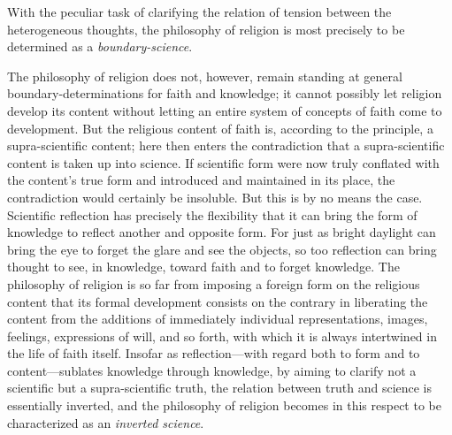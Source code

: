 \documentclass[12pt,a4paper]{article}
\begin{document}
With the peculiar task of clarifying the relation of tension
between the heterogeneous thoughts, the philosophy of religion
is most precisely to be determined as a \emph{boundary-science}.

The philosophy of religion does not, however, remain standing at
general boundary-determinations for faith and knowledge; it
cannot possibly let religion develop its content without letting
an entire system of concepts of faith come to development. But
the religious content of faith is, according to the principle,
a supra-scientific content; here then enters the contradiction
that a supra-scientific content is taken up into science. If
scientific form were now truly conflated with the content's true
form and introduced and maintained in its place, the
contradiction would certainly be insoluble. But this is by no
means the case. Scientific reflection has precisely the
flexibility that it can bring the form of knowledge to reflect
another and opposite form. For just as bright daylight can bring
the eye to forget the glare and see the objects, so too
reflection can bring thought to see, in knowledge, toward faith
and to forget knowledge. The philosophy of religion is so far
from imposing a foreign form on the religious content that its
formal development consists on the contrary in liberating the
content from the additions of immediately individual
representations, images, feelings, expressions of will, and so
forth, with which it is always intertwined in the life of faith
itself. Insofar as reflection---with regard both to form and to
content---sublates knowledge through knowledge, by aiming to
clarify not a scientific but a supra-scientific truth, the
relation between truth and science is essentially inverted, and
the philosophy of religion becomes in this respect to be
characterized as an \emph{inverted science}.
\end{document}
